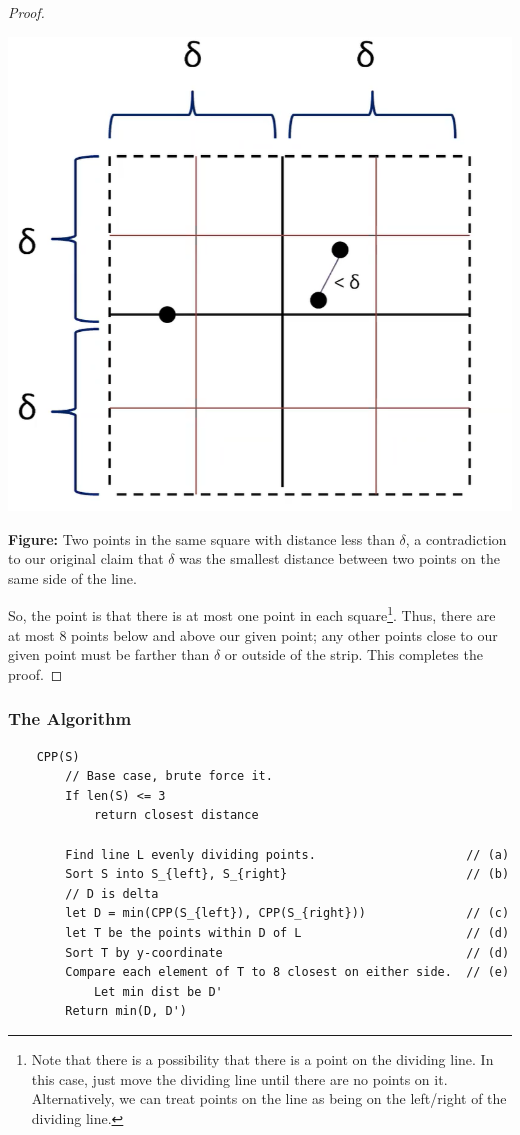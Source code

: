 \documentclass[letterpaper]{article}
\begin{document}
\begin{mdframed}[]
\begin{proof}
\begin{center}
            \includegraphics[scale=0.37]{assets/closest_proof_4.png}

            \textbf{Figure:} Two points in the same square with distance less than $\delta$, a contradiction to our original claim that $\delta$ was the smallest distance between two points on the same side of the line. 
        \end{center}
        
        So, the point is that there is at most one point in each square\footnote{Note that there is a possibility that there is a point on the dividing line. In this case, just move the dividing line until there are no points on it. Alternatively, we can treat points on the line as being on the left/right of the dividing line.}. Thus, there are at most 8 points below and above our given point; any other points close to our given point must be farther than $\delta$ or outside of the strip. This completes the proof. 
    \end{proof}
\end{mdframed}

\subsubsection{The Algorithm}
\begin{verbatim}
    CPP(S)
        // Base case, brute force it. 
        If len(S) <= 3
            return closest distance 
        
        Find line L evenly dividing points.                     // (a)
        Sort S into S_{left}, S_{right}                         // (b)
        // D is delta 
        let D = min(CPP(S_{left}), CPP(S_{right}))              // (c)
        let T be the points within D of L                       // (d)
        Sort T by y-coordinate                                  // (d)
        Compare each element of T to 8 closest on either side.  // (e)
            Let min dist be D' 
        Return min(D, D')
\end{verbatim}
\end{document}
